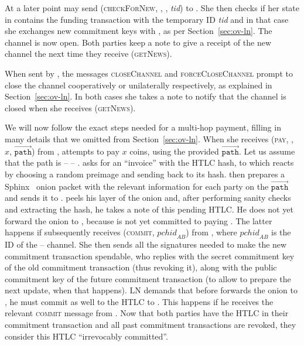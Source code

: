     At a later point \environment{} may send (\textsc{checkForNew}, \alice,
    \bob, \textit{tid}) to \alice. She then checks if her state in \ledger{}
    contains the funding transaction with the temporary ID \textit{tid} and in
    that case she exchanges new commitment keys with \bob, as per
    Section~\ref{sec:ov-ln}. The channel is now open. Both parties keep a note
    to give \environment{} a receipt of the new channel the next time they
    receive (\textsc{getNews}).

    When sent by \environment, the messages \textsc{closeChannel} and
    \textsc{forceCloseChannel} prompt \alice{} to close the channel
    cooperatively or unilaterally respectively, as explained in
    Section~\ref{sec:ov-ln}. In both cases she takes a note to notify
    \environment{} that the channel is closed when she receives
    (\textsc{getNews}).

    We will now follow the exact steps needed for a multi-hop payment, filling
    in many details that we omitted from Section~\ref{sec:ov-ln}. When she
    receives (\textsc{pay}, \charlie, $x$, $\overrightarrow{\mathtt{path}}$)
    from \environment, \alice{} attempts to pay \charlie{} $x$ coins, using the
    provided $\overrightarrow{\mathtt{path}}$. Let us assume that the path is
    \alice{} -- \bob{} -- \charlie. \alice{} asks \charlie{} for an ``invoice''
    with the HTLC hash, to which \charlie{} reacts by choosing a random preimage
    and sending back to \alice{} its hash. \alice{} then prepares a
    Sphinx~\cite{sphinx} onion packet with the relevant information for each
    party on the $\overrightarrow{\mathtt{path}}$ and sends it to \bob{}. \bob{}
    peels his layer of the onion and, after performing sanity checks and
    extracting the hash, he takes a note of this pending HTLC. He does not yet
    forward the onion to \charlie, because \alice{} is not yet committed to
    paying \bob. The latter happens if \alice{} subsequently receives
    (\textsc{commit}, $\mathit{pchid}_{AB}$) from \environment, where
    $\mathit{pchid}_{AB}$ is the ID of the \alice{} -- \bob{} channel. She then
    sends \bob{} all the signatures needed to make the new commitment
    transaction spendable, who replies with the secret commitment key of the old
    commitment transaction (thus revoking it), along with the public commitment
    key of the future commitment transaction (to allow \alice{} to prepare the
    next update, when that happens). LN demands that before \bob{} forwards the
    onion to \charlie, he must commit as well to the HTLC to \alice. This
    happens if he receives the relevant \textsc{commit} message from
    \environment. Now that both parties have the HTLC in their commitment
    transaction and all past commitment transactions are revoked, they consider
    this HTLC ``irrevocably committed''.

